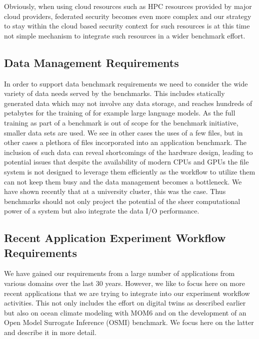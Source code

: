 \documentclass[utf8]{FrontiersinVancouver} %
\newcommand{\TODO}[1]{\todo[inline]{#1}}
\begin{document}
Obviously, when using cloud resources such as HPC resources provided by major cloud providers, federated security becomes even more complex and our strategy to stay within the cloud based security context for such resources is at this time not  simple mechanism to integrate such resources in a wider benchmark effort.


\subsection{Data Management Requirements}
\label{sec:data-requirements}

In order to support data benchmark requirements we need to consider the wide variety of data needs served by the benchmarks. This includes statically generated data which may not involve any data storage, and reaches hundreds of petabytes for the training of for example large language models. As the full training as part of a benchmark is out of scope for the benchmark initiative, smaller data sets are used. 
We see in other cases the uses of a few files, but in other cases a plethora of files incorporated into an application benchmark. The inclusion of such data can reveal shortcomings of the hardware design, leading to potential issues that despite the availability of modern CPUs and GPUs the file system is not designed to leverage them efficiently as the workflow to utilize them can not keep them busy and the data management becomes a bottleneck. We have shown recently that at a university cluster, this was the case. Thus benchmarks should not only project the potential of the sheer computational power of a system but also integrate the data I/O performance.


\subsection{Recent Application Experiment Workflow Requirements}
\label{sec:application}

We have gained our requirements from a large number of applications from various domains over the last 30 years. However, we like to focus here on more recent applications that we are trying to integrate into our experiment workflow activities. This not only includes the effort on digital twins as described earlier but also on ocean climate modeling with MOM6 and on the development of an Open Model Surrogate Inference (OSMI) benchmark. We focus here on the latter and describe it in more detail.
\end{document}
